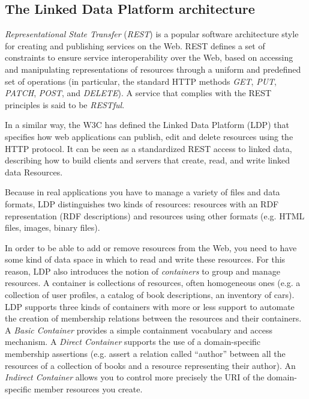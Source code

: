 \hypertarget{the-linked-data-platform-architecture}{%
\subsection{The Linked Data Platform
architecture}\label{the-linked-data-platform-architecture}}

\emph{Representational State Transfer} (\emph{REST}) is a popular
software architecture style for creating and publishing services on the
Web. REST defines a set of constraints to ensure service
interoperability over the Web, based on accessing and manipulating
representations of resources through a uniform and predefined set of
operations (in particular, the standard HTTP methods \emph{GET},
\emph{PUT}, \emph{PATCH}, \emph{POST}, and \emph{DELETE}). A service
that complies with the REST principles is said to be \emph{RESTful}.

In a similar way, the W3C has defined the Linked Data Platform (LDP)
that specifies how web applications can publish, edit and delete
resources using the HTTP protocol. It can be seen as a standardized REST
access to linked data, describing how to build clients and servers that
create, read, and write linked data Resources.

Because in real applications you have to manage a variety of files and
data formats, LDP distinguishes two kinds of resources: resources with
an RDF representation (RDF descriptions) and resources using other
formats (e.g. HTML files, images, binary files).

In order to be able to add or remove resources from the Web, you need to
have some kind of data space in which to read and write these resources.
For this reason, LDP also introduces the notion of \emph{containers} to
group and manage resources. A container is collections of resources,
often homogeneous ones (e.g. a collection of user profiles, a catalog of
book descriptions, an inventory of cars). LDP supports three kinds of
containers with more or less support to automate the creation of
membership relations between the resources and their containers. A
\emph{Basic Container} provides a simple containment vocabulary and
access mechanism. A \emph{Direct Container} supports the use of a
domain-specific membership assertions (e.g. assert a relation called
``author'' between all the resources of a collection of books and a
resource representing their author). An \emph{Indirect Container} allows
you to control more precisely the URI of the domain-specific member
resources you create.

